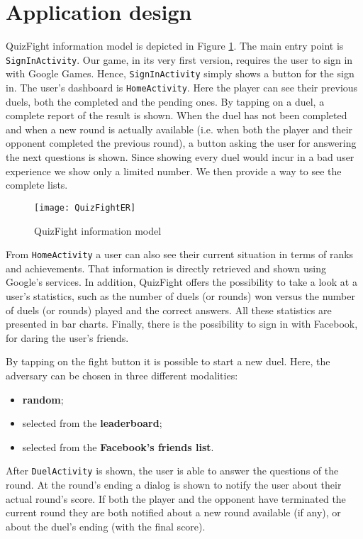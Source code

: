 \section{Application design}\label{ref:design}

QuizFight information model is depicted in Figure \ref{fig:quizfighter}.
The main entry point is \texttt{SignInActivity}.
Our game, in its very first version, requires the user to sign in with Google
Games. Hence, \texttt{SignInActivity} simply shows a button for the sign in.
The user's dashboard is \texttt{HomeActivity}.
Here the player can see their previous duels, both the completed and the
pending ones.
By tapping on a duel, a complete report of the result is shown.
When the duel has not been completed and when a new round is actually
available (i.e. when both the player and their opponent completed the
previous round), a button asking the user for answering the next questions
is shown.
Since showing every duel would incur in a bad user experience we show
only a limited number. We then provide a way to see the complete lists.

\begin{figure}[t]
	\centering
	\texttt{[image: QuizFightER]}
	\caption{QuizFight information model}
	\label{fig:quizfighter}
\end{figure}

From \texttt{HomeActivity} a user can also see their current situation in terms
of ranks and achievements.
That information is directly retrieved and shown using Google's services.
In addition, QuizFight offers the possibility to take a look at a user's
statistics, such as the number of duels (or rounds) won versus the number of
duels (or rounds) played and the correct answers.
All these statistics are presented in bar charts.
Finally, there is the possibility to sign in with Facebook, for daring the
user's friends.

By tapping on the fight button it is possible to start a new duel.
Here, the adversary can be chosen in three different modalities:

\begin{itemize}
	\item \textbf{random};
	\item selected from the \textbf{leaderboard};
	\item selected from the \textbf{Facebook's friends list}.
\end{itemize}

After \texttt{DuelActivity} is shown, the user is able to answer the
questions of the round. At the round's ending a dialog is shown to notify 
the user about their actual round's score. If both the player and the opponent 
have terminated the current round they are both notified about a new round 
available (if any), or about the duel's ending (with the final score). 
